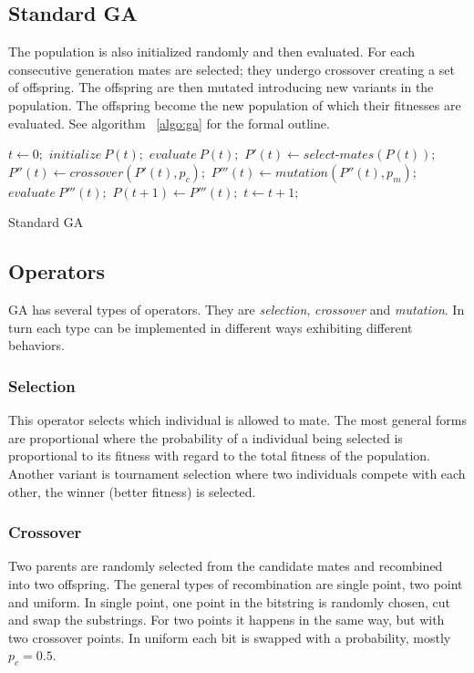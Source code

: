 \documentclass{acm_proc_article-sp}
\begin{document}
\subsection{Standard GA}
The population is also initialized randomly and then evaluated. For each consecutive generation mates are selected; they undergo crossover creating a set of offspring. The offspring are then mutated introducing new variants in the population. The offspring become the new population of which their fitnesses are evaluated. See algorithm ~\ref{algo:ga} for the formal outline.
\begin{algorithm}[h]
  \begin{algorithmic}
    \STATE $t \gets 0;$
    \STATE $initialize\: P(t);$
    \STATE $evaluate\: P(t);$
    \REPEAT
      \STATE $P'(t) \gets select\mbox{-}mates(P(t));$
      \STATE $P''(t) \gets crossover(P'(t), p_c);$
      \STATE $P'''(t) \gets mutation(P''(t), p_m);$
      \STATE $evaluate\: P'''(t);$
      \STATE $P(t+1) \gets P'''(t);$
      \STATE $t \gets t + 1;$
  \end{algorithmic}
\caption{Standard GA}\label{algo:ga}
\end{algorithm}
\subsection{Operators}
GA has several types of operators. They are \emph{selection}, \emph{crossover} and \emph{mutation}. In turn each type can be implemented in different ways exhibiting different behaviors. 

\subsubsection{Selection}
This operator selects which individual is allowed to mate. The most general forms are proportional where the probability of a individual being selected is proportional to its fitness with regard to the total fitness of the population. Another variant is tournament selection where two individuals compete with each other, the winner (better fitness) is selected.
\subsubsection{Crossover}
Two parents are randomly selected from the candidate mates and recombined into two offspring. The general types of recombination are single point, two point and uniform. In single point, one point in the bitstring is randomly chosen, cut and swap the substrings. For two points it happens in the same way, but with two crossover points. In uniform each bit is swapped with a probability, mostly $p_c = 0.5$.
\end{document}
